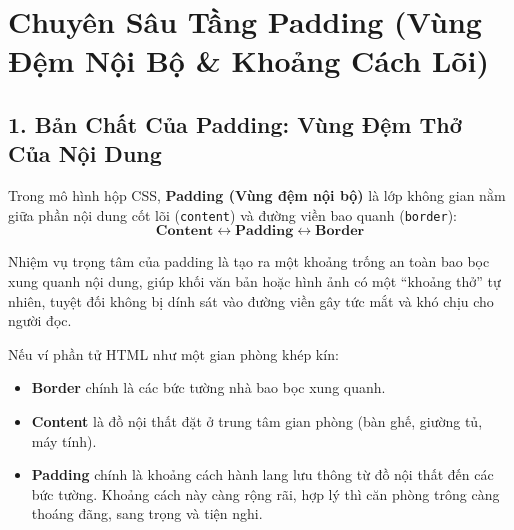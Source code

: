 \documentclass[11pt,oneside]{book}
\newcommand{\thd}[1]{\textcolor{white}{\textbf{\strut #1}}}
\newcommand{\codeinline}[1]{\textcolor{accentOrange}{\texttt{#1}}}
\begin{document}
\begin{prettyTableBox}
\end{prettyTableBox}

\section{Chuyên Sâu Tầng Padding (Vùng Đệm Nội Bộ \& Khoảng Cách Lõi)}
\label{sec:box_model_padding_deep_dive}

\subsection{1. Bản Chất Của Padding: Vùng Đệm Thở Của Nội Dung}

Trong mô hình hộp CSS, \textbf{Padding (Vùng đệm nội bộ)} là lớp không gian nằm giữa phần nội dung cốt lõi (\codeinline{content}) và đường viền bao quanh (\codeinline{border}):
\[
\mathbf{Content \longleftrightarrow Padding \longleftrightarrow Border}
\]

Nhiệm vụ trọng tâm của padding là tạo ra một khoảng trống an toàn bao bọc xung quanh nội dung, giúp khối văn bản hoặc hình ảnh có một ``khoảng thở'' tự nhiên, tuyệt đối không bị dính sát vào đường viền gây tức mắt và khó chịu cho người đọc.

\begin{conceptBox}
Nếu ví phần tử HTML như một gian phòng khép kín:
\begin{itemize}[leftmargin=1.5em, itemsep=2.5pt, parsep=0pt]
    \item \textbf{Border} chính là các bức tường nhà bao bọc xung quanh.
    \item \textbf{Content} là đồ nội thất đặt ở trung tâm gian phòng (bàn ghế, giường tủ, máy tính).
    \item \textbf{Padding} chính là khoảng cách hành lang lưu thông từ đồ nội thất đến các bức tường. Khoảng cách này càng rộng rãi, hợp lý thì căn phòng trông càng thoáng đãng, sang trọng và tiện nghi.
\end{itemize}
\end{conceptBox}
\end{document}
